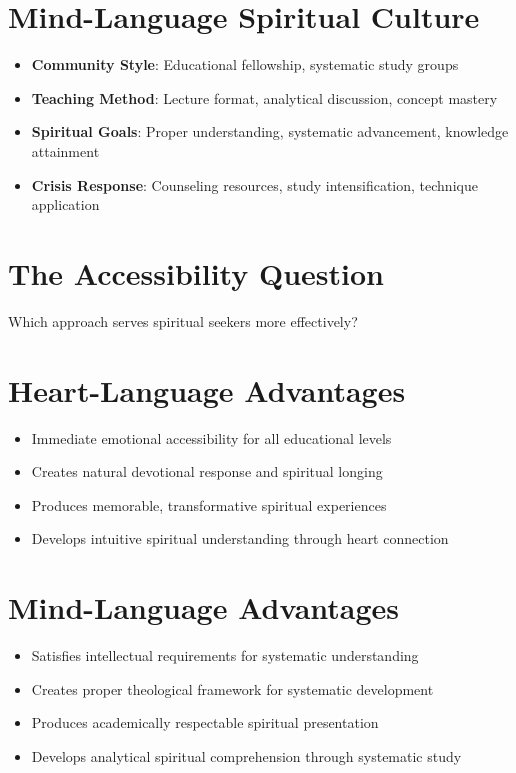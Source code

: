 \documentclass[11pt,twoside]{book}
\begin{document}
\section*{Mind-Language Spiritual Culture}
\label{sec:orgc27933d}
\begin{itemize}
\item \textbf{\textbf{Community Style}}: Educational fellowship, systematic study groups
\item \textbf{\textbf{Teaching Method}}: Lecture format, analytical discussion, concept mastery
\item \textbf{\textbf{Spiritual Goals}}: Proper understanding, systematic advancement, knowledge attainment
\item \textbf{\textbf{Crisis Response}}: Counseling resources, study intensification, technique application
\end{itemize}
\section*{The Accessibility Question}
\label{sec:org04ec8c3}

Which approach serves spiritual seekers more effectively?
\section*{Heart-Language Advantages}
\label{sec:org6186f9e}
\begin{itemize}
\item Immediate emotional accessibility for all educational levels
\item Creates natural devotional response and spiritual longing
\item Produces memorable, transformative spiritual experiences
\item Develops intuitive spiritual understanding through heart connection
\end{itemize}
\section*{Mind-Language Advantages}
\label{sec:org23400a6}
\begin{itemize}
\item Satisfies intellectual requirements for systematic understanding
\item Creates proper theological framework for systematic development
\item Produces academically respectable spiritual presentation
\item Develops analytical spiritual comprehension through systematic study
\end{itemize}
\end{document}
